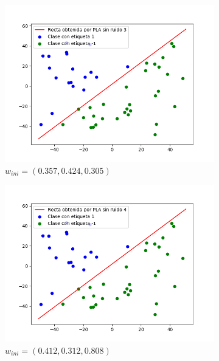 \documentclass[12pt,a4paper]{article}
\begin{document}
\begin{figure}[H]
	\centering
	\begin{subfigure}{0.32\textwidth}
		\includegraphics[scale=0.37]{./Imagenes/ej2-5.png}
		\caption{$w_{ini} = (0.357,0.424,0.305)$}
	\end{subfigure}
	\begin{subfigure}{0.33\textwidth}
		\includegraphics[scale=0.37]{./Imagenes/ej2-6.png}
		\caption{$w_{ini} = (0.412,0.312,0.808)$}
	\end{subfigure}
	\begin{subfigure}{0.33\textwidth}

\end{subfigure}
\end{figure}
\end{document}
